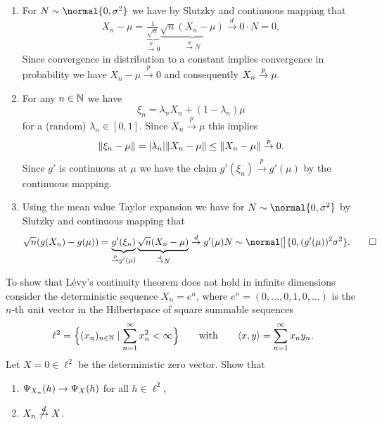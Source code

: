 \documentclass[11pt]{article}
\begin{document}
\begin{solution}
    \begin{enumerate}[wide=0pt]
        \item[\ref{it: (delta-method) X_n to mu}] For \(N\sim \normal{0,\sigma^2}\) we have 
        by Slutzky
        and continuous mapping that
        \[
            X_n -\mu
            = \underbrace{\tfrac1{\sqrt{n}}}_{\overset{p}\to 0}
            \underbrace{\sqrt{n}(X_n - \mu)}_{\overset{d}\to N}
            \overset{d}\to 0 \cdot N = 0,
        \]
        Since convergence in distribution to a constant implies convergence in probability
        we have \(X_n - \mu\overset{p}\to 0\) and consequently \(\X_n \overset{p}\to \mu\).

        \item[\ref{it: (delta-method) taylor expansion}] For any \(n\in \nat\) we
        have
        \[
            \xi_n = \lambda_n X_n + (1-\lambda_n)\mu
        \]
        for a (random) \(\lambda_n \in [0,1]\). Since \(X_n \overset{p}\to
        \mu\) this implies 
        \[
            \norm{\xi_n - \mu}
            = \abs{\lambda_n} \norm{X_n - \mu}
            \le \norm{X_n - \mu}
            \overset{p}\to 0.
        \]
        Since \(g'\) is continuous at \(\mu\) we have the claim \(g'(\xi_n)
        \overset{p}\to g'(\mu)\) by the continuous mapping.
        
        \item[\ref{it: (delta-method) proof}] Using the mean value Taylor
        expansion we have for \(N\sim \normal{0, \sigma^2}\)
        by Slutzky and continuous mapping that
        \[
            \sqrt{n}(g(X_n) - g(\mu))
            = \underbrace{g'(\xi_n)}_{\overset{p}\to g'(\mu)} \underbrace{\sqrt{n}(X_n - \mu)}_{\overset{d}\to N}
            \overset{d}\to g'(\mu) N \sim \normal[\big]{0, (g'(\mu))^2\sigma^2}. 
            \qedhere
        \]
    \end{enumerate}
\end{solution}


\begin{exercise}[subtitle={Lévy's continuity theorem in infinite dimensions}]
    \label{ex: counterexample levy's continuity in infinite dim}
    To show that Lévy's continuity theorem does not hold in infinite dimensions
    consider the deterministic sequence \(X_n = e^n\), where \(e^n=(0,\dots,0, 1, 0, \dots)\) is the
    \(n\)-th unit vector in the Hilbertspace of square summable sequences 
    \[
        \ell^2 = \set[\Big]{(x_n)_{n\in \nat} \mid \sum_{n=1}^\infty x_n^2 < \infty}
        \qquad\text{with}\qquad
        \scp{x, y} = \sum_{n=1}^\infty x_n y_n.
    \]
    Let \(X=0\in \ell^2\) be the deterministic zero vector. Show that
    \begin{enumerate}[label=(\alph*), noitemsep]
        \item\label{it: (counterexample levy's continuity in infinite dim) charfct}
        \(\charFct_{X_n}(h) \to \charFct_{X}(h)\) for all \(h\in \ell^2\),
        \item\label{it: (counterexample levy's continuity in infinite dim) convergence in distribution}
        \(X_n \not\overset{d}\to X\).
    \end{enumerate}
\end{exercise}
\end{document}
